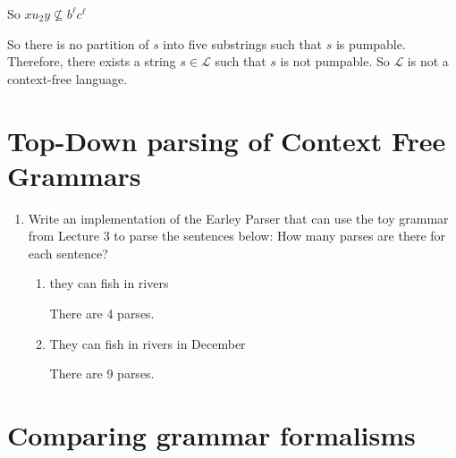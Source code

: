 \documentclass[10pt,\jkfside,a4paper]{article}
\begin{document}
\begin{enumerate}
\begin{enumerate}
\begin{itemize}
So $x u_2 y \nsubseteq b^\ell c^\ell$

\end{itemize}

So there is no partition of $s$ into five substrings such that $s$ is
pumpable. Therefore, there exists a string $s \in \mathcal L$ such that $s$
is not pumpable. So $\mathcal L$ is not a context-free language.

\end{enumerate}

\end{enumerate}

\section{Top-Down parsing of Context Free Grammars}

\begin{enumerate}

\item Write an implementation of the Earley Parser that can use the toy
grammar from Lecture 3 to parse the sentences below: How many parses are
there for each sentence?

\begin{enumerate}[label=(\alph*)]

\item they can fish in rivers

There are 4 parses.

\item They can fish in rivers in December

There are 9 parses.

\end{enumerate}

\end{enumerate}

\section{Comparing grammar formalisms}
\end{document}
